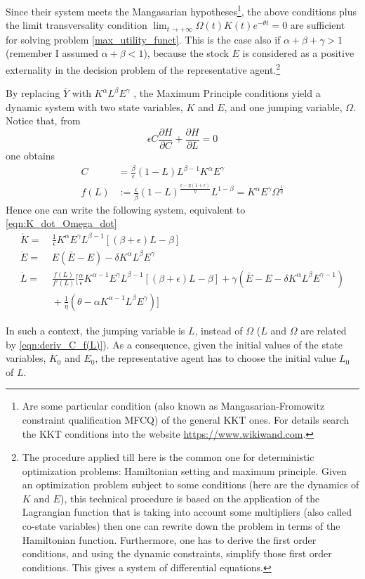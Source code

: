 Since their system meets the Mangasarian hypotheses\footnote{Are some particular condition (also known as Mangasarian-Fromowitz constraint qualification MFCQ) of the general KKT ones. For details search the KKT conditions into the website \url{https://www.wikiwand.com}.}, the above conditions plus the limit transversality condition $\lim_{t\rightarrow +\infty} \Omega(t)K(t)e^{-\theta t} = 0$ are sufficient for solving problem \eqref{max_utility_funct}. This is the case also if $\alpha+\beta+\gamma>1$ (remember I assumed $\alpha + \beta < 1$), because the stock $E$ is considered as a positive externality in the decision problem of the representative agent.\footnote{The procedure applied till here is the common one for deterministic optimization problems: Hamiltonian setting and maximum principle. Given an optimization problem subject to some conditions (here are the dynamics of $K$ and $E$), this technical procedure is based on the application of the Lagrangian function that is taking into account some multipliers (also called co-state variables) then one can rewrite down the problem in terms of the Hamiltonian function. Furthermore, one has to derive the first order conditions, and using the dynamic constraints, simplify those first order conditions. This gives a system of differential equations.}

By replacing $\bar{Y}$ with $K^\alpha L^\beta E^\gamma$ , the Maximum Principle conditions yield a dynamic system with two state variables, $K$ and $E$, and one jumping variable, $\Omega$. Notice that, from 
$$\epsilon C\frac{\partial H}{\partial C}+\frac{\partial H}{\partial L}=0$$
one obtains
\begin{equation} \label{eqn:deriv_C_f(L)}
\begin{split}
	C& =\frac{\beta}{\epsilon}(1-L)L^{\beta-1}K^\alpha E^\gamma \\
	f(L)& :=\frac{\epsilon}{\beta}(1-L)^{\frac{\epsilon-\eta(1+\epsilon)}{\eta}}L^{1-\beta}=K^\alpha E^\gamma \Omega^{\frac{1}{\eta}}
\end{split}
\end{equation}
Hence one can write the following system, equivalent to \eqref{eqn:K_dot_Omega_dot}
\begin{equation} \label{eqn:K_dot_E_dot_L_dot}
	\begin{split}
		\dot{K} =&\ \frac{1}{\epsilon} K^\alpha E^\gamma  L^{\beta-1}[(\beta+\epsilon)L-\beta] \\
		\dot{E} =&\ E(\bar{E}-E)-\delta K^\alpha L^\beta E^\gamma \\
		\dot{L} =&\ \frac{f(L)}{f'(L)} \Big[\frac{\alpha}{\epsilon}K^{\alpha-1} E^\gamma  L^{\beta-1}[(\beta+\epsilon)L-\beta]+\gamma(\bar{E}-E-\delta K^\alpha L^\beta E^{\gamma-1})\\
		&\ +\frac{1}{\eta}(\theta-\alpha K^{\alpha-1}L^\beta E^\gamma) \Big]
	\end{split}
\end{equation}

In such a context, the jumping variable is $L$, instead of $\Omega$ ($L$ and $\Omega$ are related by \eqref{eqn:deriv_C_f(L)}). As a consequence, given the initial values of the state variables, $K_0$ and $E_0$, the representative agent has to choose the initial value $L_0$ of $L$.